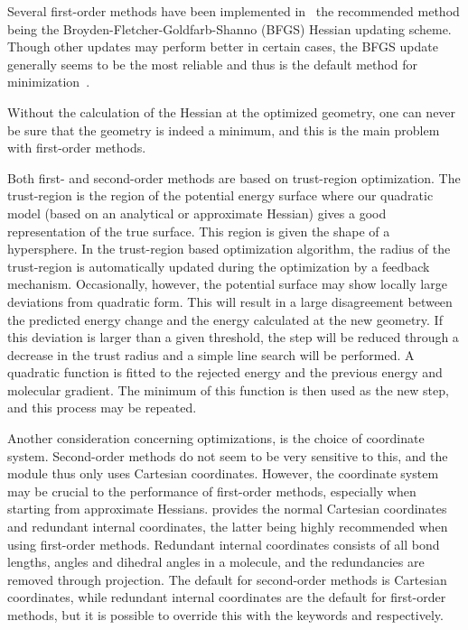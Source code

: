 Several first-order methods have been implemented in \dalton\, the
recommended method being the Broyden-Fletcher-Goldfarb-Shanno (BFGS)
Hessian updating
scheme. Though other updates may perform better in
certain cases, the BFGS update generally seems to be the most
reliable and thus is the default method for minimization~\cite{vbthjcp117}.

Without the calculation of the Hessian at the optimized geometry, one
can never be sure that the geometry is indeed a minimum, and this is the
main problem with first-order methods.

Both first- and second-order methods are based on
trust-region
optimization. The trust-region is the region of the potential energy
surface where our quadratic model (based on an analytical or
approximate Hessian) gives a good representation of the true
surface. This region is given the shape of a
hypersphere. In the trust-region based optimization algorithm, the
radius of the trust-region is
automatically updated during the optimization by a feedback mechanism.
Occasionally, however, the potential surface may show locally large
deviations from quadratic form. This will result in a large
disagreement between the predicted energy change and the energy
calculated at the new geometry. If this deviation is larger than a
given threshold, the step will be reduced through a decrease in the
trust radius and a simple line search will be performed. A quadratic
function is fitted 
to the rejected energy and the previous energy and molecular gradient. The
minimum of this function is then used as the new step, and this
process may be repeated.

Another consideration concerning optimizations, is the choice of
coordinate system. Second-order methods do not seem to be very
sensitive to this, and the  module thus only uses
Cartesian coordinates. However, the coordinate system may be crucial
to the performance of first-order methods, especially when starting
from approximate Hessians.  provides the normal Cartesian
coordinates
and redundant internal coordinates,
the latter being highly recommended when using
first-order methods. Redundant internal coordinates consists of all
bond lengths, angles and dihedral angles in a molecule, and the
redundancies are removed through projection. The default for
second-order methods is Cartesian coordinates, while redundant
internal coordinates are the default for first-order methods, but it is
possible to override this with the keywords  and
 respectively.

